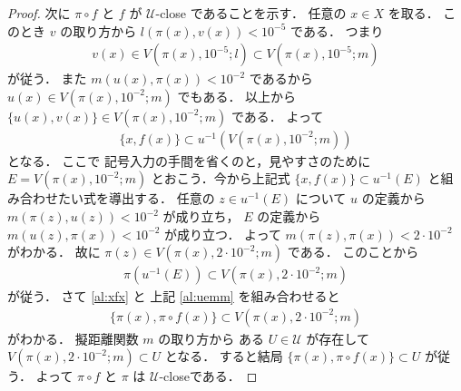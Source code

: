 \documentclass[leqno, a4paper, 12pt]{jsarticle}
\numberwithin{equation}{section}
\newcommand{\yocovfont}[1]{\mathscr{#1}}
\newcommand{\yoball}[3]{V(#1, #2; #3)}
\begin{document}
\begin{proof}
次に
$\pi\circ f$
と
$f$
が
$\yocovfont{U}$-close
であることを示す．
任意の
$x\in X$
を取る．
このとき
$v$
の取り方から
$l(\pi(x), v(x))<10^{-5}$
である．
つまり
\begin{align}
v(x)\in \yoball{\pi(x)}{10^{-5}}{l}\subset \yoball{\pi(x)}{10^{-5}}{m}
\end{align}
が従う．
また
$m(u(x), \pi(x))<10^{-2}$
であるから
$u(x)\in \yoball{\pi(x)}{10^{-2}}{m}$
でもある．
以上から
$\{u(x), v(x)\}\in \yoball{\pi(x)}{10^{-2}}{m}$
である．
よって
\begin{align}\label{al:xfx}
\{x, f(x)\}\subset u^{-1}(\yoball{\pi(x)}{10^{-2}}{m})
\end{align}
となる．
ここで
記号入力の手間を省くのと，見やすさのために
$E=\yoball{\pi(x)}{10^{-2}}{m}$
とおこう．今から上記式
$\{x, f(x)\}\subset u^{-1}(E)$
と組み合わせたい式を導出する．
任意の
$z\in u^{-1}(E)$
について
$u$
の定義から
$m(\pi(z), u(z))<10^{-2}$
が成り立ち，
$E$
の定義から
$m(u(z), \pi(x))<10^{-2}$
が成り立つ．
よって
$m(\pi(z), \pi(x))<2\cdot 10^{-2}$
がわかる．
故に
$\pi(z)\in \yoball{\pi(x)}{2\cdot 10^{-2}}{m}$
である．
このことから
\begin{align}\label{al:uemm}
\pi(u^{-1}(E))\subset  \yoball{\pi(x)}{2\cdot 10^{-2}}{m}
\end{align}
が従う．
さて
\eqref{al:xfx}
と
上記
\eqref{al:uemm}
を組み合わせると
\begin{align}\label{al:pixpifx}
\{\pi(x), \pi\circ f(x)\}\subset  \yoball{\pi(x)}{2\cdot 10^{-2}}{m}
\end{align}
がわかる．
擬距離関数
$m$
の取り方から
ある
$U\in \yocovfont{U}$
が存在して
$ \yoball{\pi(x)}{2\cdot 10^{-2}}{m}\subset U$
となる．
すると結局
$\{\pi(x), \pi\circ f(x)\}\subset U$
が従う．
よって
$\pi\circ f$
と
$\pi$
は
$\yocovfont{U}$-closeである．







\end{proof}
\end{document}
